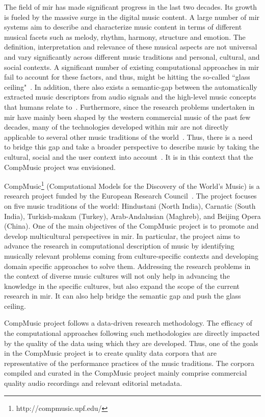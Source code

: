 The field of \gls{mir} has made significant progress in the last two decades. Its growth is fueled by the massive surge in the digital music content. A large number of \gls{mir} systems aim to describe and characterize music content in terms of different musical facets such as melody, rhythm, harmony, structure and emotion. The definition, interpretation and relevance of these musical aspects are not universal and vary significantly across different music traditions and personal, cultural, and social contexts. A significant number of existing computational approaches in \gls{mir} fail to account for these factors, and thus, might be hitting the so-called ``glass ceiling"~\citep{pachet2004improving,casey2008content}. In addition, there also exists a semantic-gap between the automatically extracted music descriptors from audio signals and the high-level music concepts that humans relate to~\citep{celma2006foafing,casey2008content}. Furthermore, since the research problems undertaken in \gls{mir} have mainly been shaped by the western commercial music of the past few decades, many of the technologies developed within \gls{mir} are not directly applicable to several other music traditions of the world~\citep{XavierSerra2011}. Thus, there is a need to bridge this gap and take a broader perspective to describe music by taking the cultural, social and the user context into account~\citep{roadmap_mir}. It is in this context that the CompMusic project was envisioned.

CompMusic\footnote{http://compmusic.upf.edu/} (Computational Models for the Discovery of the World's Music) is a research project funded by the European Research Council~\citep{XavierSerra2011}. The project focuses on five music traditions of the world: Hindustani (North India), Carnatic (South India), Turkish-makam (Turkey), Arab-Andalusian (Maghreb), and Beijing Opera (China). One of the main objectives of the CompMusic project is to promote and develop multicultural perspectives in \gls{mir}. In particular, the project aims to advance the research in computational description of music by identifying musically relevant problems coming from culture-specific contexts and developing domain specific approaches to solve them. Addressing the research problems in the context of diverse music cultures will not only help in advancing the knowledge in the specific cultures, but also expand the scope of the current research in \gls{mir}. It can also help bridge the semantic gap and push the glass ceiling. 

CompMusic project follows a data-driven research methodology. The efficacy of the computational approaches following such methodologies are directly impacted by the quality of the data using which they are developed. Thus, one of the goals in the CompMusic project is to create quality data corpora that are representative of the performance practices of the music traditions. The corpora compiled and curated in the CompMusic project mainly comprise commercial quality audio recordings and relevant editorial metadata. 

